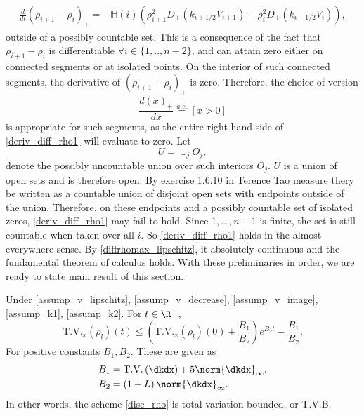 \begin{align} \label{deriv_diff_rho1}
	\frac{d}{dt} (\rho_{i+1} - \rho_i)_+ =  -\mathbb{H}(i)\left( \rho_{i+1}^2D_+(k_{i+1/2}V_{i+1}) - \rho_{i}^2D_+(k_{i-1/2}V_i)\right), 
\end{align}
outside of a possibly countable set. This is a consequence of the fact that $\rho_{i+1} - \rho_i$ is differentiable $ \forall i \in \{1,..,n-2\}$, and can attain zero either on connected segments or at isolated points. %
On the interior of such connected segments, the derivative of $(\rho_{i+1} - \rho_i)_+$ is zero. Therefore, the choice of version
\begin{equation}
	\frac{d(x)_+}{dx} \overset{a.e.}{=} [x > 0]
\end{equation}
is appropriate for such segments, as the entire right hand side of \eqref{deriv_diff_rho1} will evaluate to zero. 
Let 
\begin{equation}
	U = \cup_{j} O_j, 
\end{equation}
denote the possibly uncountable union over such interiors $O_j$. $U$ is a union of open sets and is therefore open. By exercise 1.6.10 in Terence Tao measure thery be written as a countable union of disjoint open sets with endpoints outside of the union. Therefore, on these endpoints and a possibly countable set of isolated zeros, \eqref{deriv_diff_rho1} may fail to hold. Since ${1,...,n-1}$ is finite, the set is still countable when taken over all $i$. So \eqref{deriv_diff_rho1} holds in the almost everywhere sense. By \eqref{diffrhomax_lipschitz}, it absolutely continuous and the fundamental theorem of calculus holds. With these preliminaries in order, we are ready to state main result of this section. 

\begin{lemma}
	Under \eqref{assump_v_lipschitz}, \eqref{assump_v_decrease}, \eqref{assump_v_image}, \eqref{assump_k1}, \eqref{assump_k2}. For $t \in \R^+$, 
	\begin{equation}
		\text{T.V.}_x(\rho_l)(t) \leq \left(\text{T.V.}_x(\rho_l)(0) + \frac{B_1}{B_2}\right) e^{B_2 t} - \frac{B_1}{B_2}. \label{TV_rho_bound_lemma}
	\end{equation}
	For positive constants $B_1, B_2$. These are given as 
	\begin{align}
		B_1 &= \text{T.V.}\left(\dkdx\right) + 5 \norm{\dkdx}_\infty, \\
		B_2 &= \left(1 + L\right)\norm{\dkdx}_\infty.
	\end{align}
	In other words, the scheme \eqref{disc_rho} is total variation bounded, or T.V.B. 
\end{lemma}

